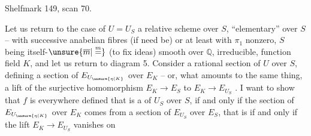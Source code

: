 Shelfmark 149, scan 70.

Let us return to the case of $U=U_S$ a relative scheme over $S$, ``elementary'' over $S$ -- with successive anabelian fibres (if need be) or at least with $\pi_1$ nonzero, $S$ being itself-$\unsure{\overline m|\overset{m}{=}}$ (to fix ideas) smooth over $\mathbb{Q}$, irreducible, function field $K$, and let us return to diagram 5. Consider a rational section  of $U$ over $S$, defining a section of $E_{U_{\unsure{\eta|K}}}$ over $E_K$ -- or, what amounts to the same thing, a lift of the surjective homomorphism $E_K\longrightarrow E_S$ to $E_K\longrightarrow E_{U_S}$ . I want to show that $f$ is everywhere defined that is a   of $U_S$ over $S$, if and only if the section of $E_{U_{\unsure{\eta|K}}}$ over $E_K$ comes from a section of $E_{U_S}$ over $E_S$, that is if and only if the lift $E_K\longrightarrow E_{U_S}$ vanishes on
